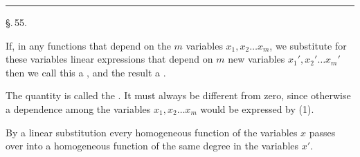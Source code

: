 
\begin{center}


\rule{0.3\linewidth}{0.4pt}

\S.\,55.

\end{center}

If, in any functions that depend on the $m$ variables $x_1, x_2 \ldots x_m$, we substitute for these variables linear expressions that depend on $m$ new variables $x_1', x_2' \ldots x_m'$
then we call this a , and the result a .

The quantity
is called the . It must always be different from zero, since otherwise a dependence among the variables $x_1, x_2 \ldots x_m$ would be expressed by (1).

By a linear substitution every homogeneous function of the variables $x$ passes over into a homogeneous function of the same degree in the variables $x'$.
